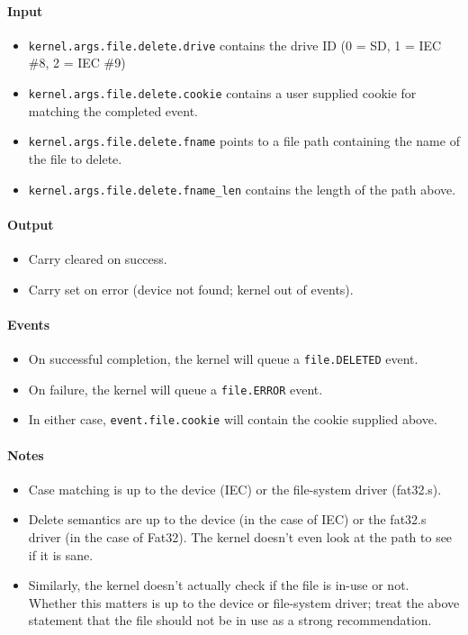 \paragraph{Input}
\begin{itemize}
\item \verb+kernel.args.file.delete.drive+ contains the drive ID (0 = SD, 1 = IEC \#8, 2 = IEC \#9)
\item \verb+kernel.args.file.delete.cookie+ contains a user supplied cookie for matching the completed event.
\item \verb+kernel.args.file.delete.fname+ points to a file path containing the name of the file to delete.
\item \verb+kernel.args.file.delete.fname_len+ contains the length of the path above.
\end{itemize}

\paragraph{Output}
\begin{itemize}
\item Carry cleared on success.
\item Carry set on error (device not found; kernel out of events).
\end{itemize}

\paragraph{Events}
\begin{itemize}
\item On successful completion, the kernel will queue a \verb+file.DELETED+ event.
\item On failure, the kernel will queue a \verb+file.ERROR+ event.
\item In either case, \verb+event.file.cookie+ will contain the cookie supplied above.
\end{itemize}

\paragraph{Notes}
\begin{itemize}
\item Case matching is up to the device (IEC) or the file-system driver (fat32.s).
\item Delete semantics are up to the device (in the case of IEC) or the fat32.s driver (in the case of Fat32).  The kernel doesn't even look at the path to see if it is sane. 

\item Similarly, the kernel doesn't actually check if the file is in-use or not.  Whether this matters is up to the device or file-system driver; treat the above statement that the file should not be in use as a strong recommendation. 
\end{itemize}

